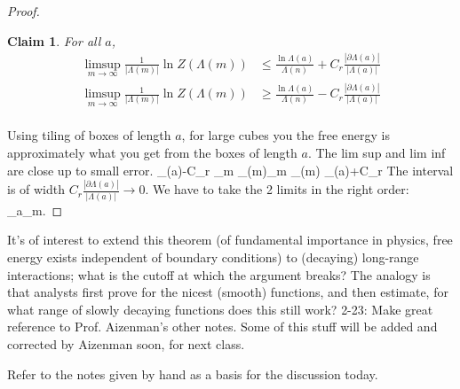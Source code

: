 \documentclass[12pt]{book}
\newtheorem{clm}[thm]{Claim}
\theoremstyle{norm}
\begin{document}
\begin{proof}
\begin{clm}
For all $a$,
\begin{align*}
\limsup_{m\to\infty} \frac{1}{|\Lambda(m)|}\ln Z(\Lambda(m))& \le \frac{\ln \Lambda(a)}{\Lambda(n)} + C_r\frac{|\partial \Lambda(a)|}{|\Lambda(a)|}\\
\limsup_{m\to\infty} \frac{1}{|\Lambda(m)|}\ln Z(\Lambda(m)) & \ge \frac{\ln \Lambda(a)}{\Lambda(n)} - C_r\frac{|\partial \Lambda(a)|}{|\Lambda(a)|}\\
\end{align*}
\end{clm}
Using tiling of boxes of length $a$, for large cubes you the free energy is approximately what you get from the boxes of length $a$. 
The lim sup and lim inf are close up to small error.
\be
\psi_{\Lambda(a)}-C_r 
\le
\liminf_{m\to \infty} \psi_{\Lambda(m)}\le \limsup_{m\to \infty} \psi_{\Lambda(m)} 
\le 
\psi_{\Lambda(a)}+C_r 
\ee
The interval is of width $C_r \frac{|\partial \Lambda (a)|}{|\Lambda(a)|}\to 0$. We have to take the 2 limits in the right order:
\be
\lim_{a\to \infty}\lim_{m\to \infty}.
\ee
\end{proof}

It's of interest to extend this theorem (of fundamental importance in physics, free energy exists independent of boundary conditions) to (decaying) long-range interactions; what is the cutoff at which the argument breaks? The analogy is that analysts first prove for the nicest (smooth) functions, and then estimate, for what range of slowly decaying functions does this still work?
{\color{blue}2-23: Make great reference to Prof. Aizenman's other notes. Some of this stuff will be added and corrected by Aizenman soon, for next class.}

Refer to the notes given by hand as a basis for the discussion today. 
\end{document}
